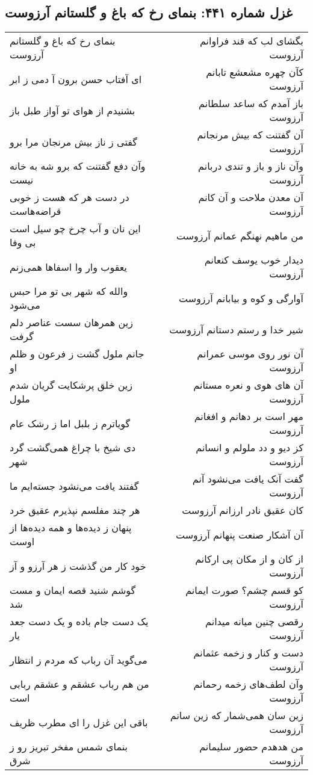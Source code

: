 \begin{center}
\section*{غزل شماره ۴۴۱: بنمای رخ که باغ و گلستانم آرزوست}
\label{sec:0441}
\begin{longtable}{l p{0.5cm} r}
بنمای رخ که باغ و گلستانم آرزوست
&&
بگشای لب که قند فراوانم آرزوست
\\
ای آفتاب حسن برون آ دمی ز ابر
&&
کآن چهره مشعشع تابانم آرزوست
\\
بشنیدم از هوای تو آواز طبل باز
&&
باز آمدم که ساعد سلطانم آرزوست
\\
گفتی ز ناز بیش مرنجان مرا برو
&&
آن گفتنت که بیش مرنجانم آرزوست
\\
وآن دفع گفتنت که برو شه به خانه نیست
&&
وآن ناز و باز و تندی دربانم آرزوست
\\
در دست هر که هست ز خوبی قراضه‌هاست
&&
آن معدن ملاحت و آن کانم آرزوست
\\
این نان و آب چرخ چو سیل است بی وفا
&&
من ماهیم نهنگم عمانم آرزوست
\\
یعقوب وار وا اسفاها همی‌زنم
&&
دیدار خوب یوسف کنعانم آرزوست
\\
والله که شهر بی تو مرا حبس می‌شود
&&
آوارگی و کوه و بیابانم آرزوست
\\
زین همرهان سست عناصر دلم گرفت
&&
شیر خدا و رستم دستانم آرزوست
\\
جانم ملول گشت ز فرعون و ظلم او
&&
آن نور روی موسی عمرانم آرزوست
\\
زین خلق پرشکایت گریان شدم ملول
&&
آن های هوی و نعره مستانم آرزوست
\\
گویاترم ز بلبل اما ز رشک عام
&&
مهر است بر دهانم و افغانم آرزوست
\\
دی شیخ با چراغ همی‌گشت گرد شهر
&&
کز دیو و دد ملولم و انسانم آرزوست
\\
گفتند یافت می‌نشود جسته‌ایم ما
&&
گفت آنک یافت می‌نشود آنم آرزوست
\\
هر چند مفلسم نپذیرم عقیق خرد
&&
کان عقیق نادر ارزانم آرزوست
\\
پنهان ز دیده‌ها و همه دیده‌ها از اوست
&&
آن آشکار صنعت پنهانم آرزوست
\\
خود کار من گذشت ز هر آرزو و آز
&&
از کان و از مکان پی ارکانم آرزوست
\\
گوشم شنید قصه ایمان و مست شد
&&
کو قسم چشم؟ صورت ایمانم آرزوست
\\
یک دست جام باده و یک دست جعد یار
&&
رقصی چنین میانه میدانم آرزوست
\\
می‌گوید آن رباب که مردم ز انتظار
&&
دست و کنار و زخمه عثمانم آرزوست
\\
من هم رباب عشقم و عشقم ربابی است
&&
وآن لطف‌های زخمه رحمانم آرزوست
\\
باقی این غزل را ای مطرب ظریف
&&
زین سان همی‌شمار که زین سانم آرزوست
\\
بنمای شمس مفخر تبریز رو ز شرق
&&
من هدهدم حضور سلیمانم آرزوست
\\
\end{longtable}
\end{center}
